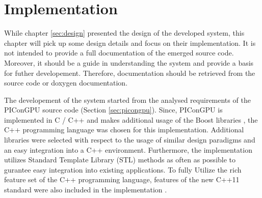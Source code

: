 \chapter{Implementation}
\label{sec:implementation}


While chapter \ref{sec:design} presented the design of the developed
system, this chapter will pick up some design details and focus on
their implementation.  It is not intended to provide a full
documentation of the emerged source code. Moreover, it should be a
guide in understanding the system and provide a basis for futher
developement. Therefore, documentation should be retrieved from the
source code or doxygen \cite{ref:doxygen} documentation.

The developement of the system started from the analysed requirements
of the PIConGPU source code (Section \ref{sec:picongpu}). Since,
PIConGPU is implemented in C / C++ and makes additional usage of the
Boost libraries \cite{ref:boost}, the C++ programming language was
chosen for this implementation. Additional libraries were selected with
respect to the usage of similar design paradigms and an easy
integration into a C++ environment. Furthermore, the implementation
utilizes Standard Template Library (STL) methods as often as
possible to gurantee easy integration into existing applications.  To
fully Utilize the rich feature set of the C++ programming language,
features of the new C++11 standard were also included in the
implementation \cite{ref:c++11}.

